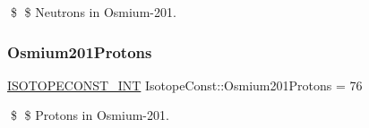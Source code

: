 \$ \$ Neutrons in Osmium-\/201. \mbox{\label{group___isotope_const-_osmium-_os201_ga076e28745c03c485df09ec145bdfdafa}} 
\subsubsection{\texorpdfstring{Osmium201\+Protons}{Osmium201Protons}}
{\footnotesize\ttfamily \mbox{\hyperlink{group___isotope_const-_macros_ga5f18360b3e99483a35c32d789e62621c}{I\+S\+O\+T\+O\+P\+E\+C\+O\+N\+S\+T\+\_\+\+I\+NT}} Isotope\+Const\+::\+Osmium201\+Protons = 76}

\$ \$ Protons in Osmium-\/201. 